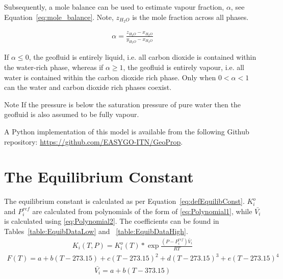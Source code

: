 Subsequently, a mole balance can be used to estimate vapour fraction, \(\alpha\), see Equation~\eqref{eq:mole_balance}. Note, \(z_{H_2O}\) is the mole fraction across all phases.

\begin{align} 
    \alpha = \frac{z_{H_2 O} - x_{H_2 O}}{y_{H_2 O} - x_{H_2 O}}  \label{eq:mole_balance}
\end{align}

If \(\alpha \leq 0\), the geofluid is entirely liquid, i.e. all carbon dioxide is contained within the water-rich phase, whereas if \(\alpha \geq 1 \), the geofluid is entirely vapour, i.e. all water is contained within the carbon dioxide rich phase. Only when \(0 < \alpha < 1\) can the water and carbon dioxide rich phases coexist.

\begin{notes}{Note}
    If the pressure is below the saturation pressure of pure water then the geofluid is also assumed to be fully vapour.
\end{notes}

A Python implementation of this model is available from the following Github repository: \url{https://github.com/EASYGO-ITN/GeoProp}.

\section{The Equilibrium Constant}
\label{sec:equib_constant}

The equilibrium constant is calculated as per Equation~\eqref{eq:defEquilibConst}.  \(K_i^{o}\) and \(P_i^{ref}\) are calculated from polynomials of the form of \eqref{eq:Polynomial1}, while \(\bar{V_i}\) is calculated using \eqref{eq:Polynomial2}. The coefficients can be found in Tables~\ref{table:EquibDataLow} and ~\ref{table:EquibDataHigh}.
\begin{align} 
    K_i(T,P) = K_i^{o}(T)*\exp{\frac{(P-P_i^{ref})\bar V_i}{RT}}   \label{eq:defEquilibConst}
\end{align}
\begin{align} 
    F(T) = a + b(T-273.15) + c(T-273.15)^2 + d(T-273.15)^3 + e(T-273.15)^4   \label{eq:Polynomial1}
\end{align}
\begin{align} 
    \bar{V_i} = a + b(T-373.15)  \label{eq:Polynomial2}
\end{align}



